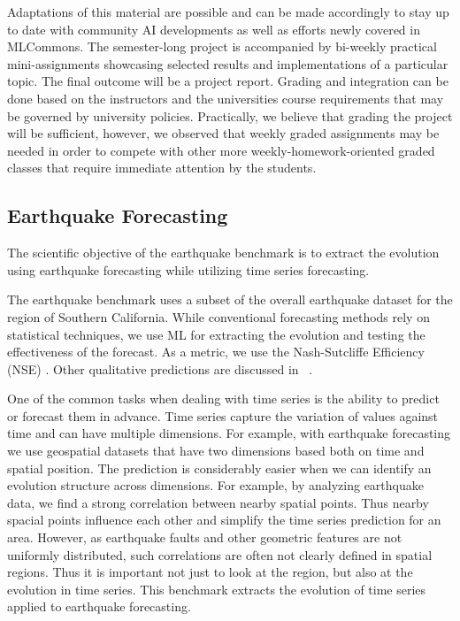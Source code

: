 \documentclass[utf8]{FrontiersinVancouver} %
\begin{document}
 Adaptations of this material are possible and can be made accordingly
 to stay up to date with community AI developments as well as efforts
 newly covered in MLCommons. The semester-long project is accompanied
 by bi-weekly practical mini-assignments showcasing selected results
 and implementations of a particular topic. The final outcome will be
 a project report. Grading and integration can be done based on the
 instructors and the universities course requirements that may be
 governed by university policies. Practically, we believe that grading
 the project will be sufficient, however, we observed that weekly
 graded assignments may be needed in order to compete with other more
 weekly-homework-oriented graded classes that require immediate
 attention by the students.


\subsection{Earthquake Forecasting}
\label{sec:eq}

The scientific objective of the earthquake benchmark is to extract the
evolution using earthquake forecasting while utilizing time series
forecasting.

The earthquake benchmark uses a subset of the overall earthquake
dataset for the region of Southern California. While conventional
forecasting methods rely on statistical techniques, we use ML for
extracting the evolution and testing the effectiveness of the
forecast.  As a metric, we use the Nash-Sutcliffe Efficiency (NSE)
\citep{nash-79}.  Other qualitative predictions are discussed in
~\citep{fox2022-jm}.

One of the common tasks when dealing with time series is the ability
to predict or forecast them in advance. Time series capture the
variation of values against time and can have multiple dimensions. For
example, with earthquake forecasting we use geospatial datasets that
have two dimensions based both on time and spatial position. The
prediction is considerably easier when we can identify an evolution
structure across dimensions. For example, by analyzing earthquake
data, we find a strong correlation between nearby spatial points. Thus
nearby spacial points influence each other and simplify the time
series prediction for an area. However, as earthquake faults and other
geometric features are not uniformly distributed, such correlations
are often not clearly defined in spatial regions. Thus it is important
not just to look at the region, but also at the evolution in time
series. This benchmark extracts the evolution of time series applied
to earthquake forecasting.
\end{document}
